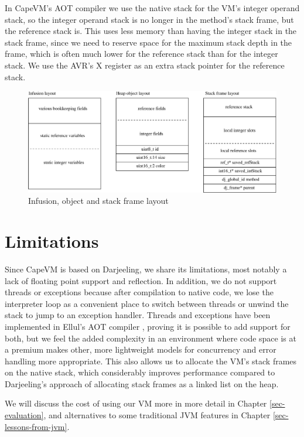In CapeVM's AOT compiler we use the native stack for the VM's integer operand stack, so the integer operand stack is no longer in the method's stack frame, but the reference stack is. This uses less memory than having the integer stack in the stack frame, since we need to reserve space for the maximum stack depth in the frame, which is often much lower for the reference stack than for the integer stack. We use the AVR's X register as an extra stack pointer for the reference stack.

\begin{figure}
\centering
\includegraphics[width=0.8\linewidth]{object-and-stack-frame-layout.eps}
\caption{Infusion, object and stack frame layout}
\label{fig-object-and-stack-frame-layout}
\end{figure}


\section{Limitations}
Since CapeVM is based on Darjeeling, we share its limitations, most notably a lack of floating point support and reflection. In addition, we do not support threads or exceptions because after compilation to native code, we lose the interpreter loop as a convenient place to switch between threads or unwind the stack to jump to an exception handler. Threads and exceptions have been implemented in Ellul's AOT compiler \cite{Ellul:2012thesis}, proving it is possible to add support for both, but we feel the added complexity in an environment where code space is at a premium makes other, more lightweight models for concurrency and error handling more appropriate. This also allows us to allocate the VM's stack frames on the native stack, which considerably improves performance compared to Darjeeling's approach of allocating stack frames as a linked list on the heap.

We will discuss the cost of using our VM more in more detail in Chapter \ref{sec-evaluation}, and alternatives to some traditional JVM features in Chapter \ref{sec-lessons-from-jvm}.


